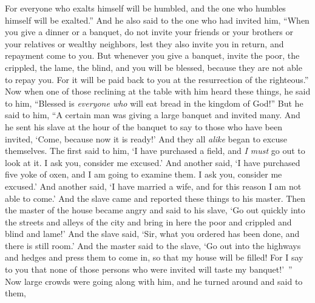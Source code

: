 \begin{biblechapter}
\verse For everyone who exalts himself will be humbled, and the one who humbles himself will be exalted.”
 And he also said to the one who had invited him, “When you give a dinner or a banquet, do not invite your friends or your brothers or your relatives or wealthy neighbors, lest they also invite you in return, and repayment come to you.
\verse But whenever you give a banquet, invite the poor, the crippled, the lame, the blind,
\verse and you will be blessed, because they are not able to repay you. For it will be paid back to you at the resurrection of the righteous.”
\verse Now when one of those reclining at the table with him heard these things, he said to him, “Blessed is \textit{everyone who} will eat bread in the kingdom of God!”
\verse But he said to him, “A certain man was giving a large banquet and invited many.
\verse And he sent his slave at the hour of the banquet to say to those who have been invited, ‘Come, because now it is ready!’
\verse And they all \textit{alike} began to excuse themselves. The first said to him, ‘I have purchased a field, and \textit{I must} go out to look at it. I ask you, consider me excused.’
\verse And another said, ‘I have purchased five yoke of oxen, and I am going to examine them. I ask you, consider me excused.’
\verse And another said, ‘I have married a wife, and for this reason I am not able to come.’
\verse And the slave came and reported these things to his master. Then the master of the house became angry and said to his slave, ‘Go out quickly into the streets and alleys of the city and bring in here the poor and crippled and blind and lame!’
\verse And the slave said, ‘Sir, what you ordered has been done, and there is still room.’
\verse And the master said to the slave, ‘Go out into the highways and hedges and press them to come in, so that my house will be filled!
\verse For I say to you that none of those persons who were invited will taste my banquet!’ ”
 Now large crowds were going along with him, and he turned around and said to them,

\end{biblechapter}
